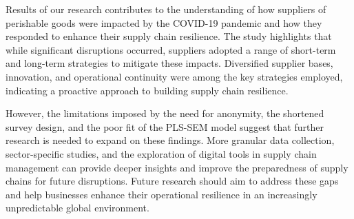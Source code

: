  Results of our research contributes to the understanding of how suppliers of perishable goods were impacted by the COVID-19 pandemic and how they responded to enhance their supply chain resilience. The study highlights that while significant disruptions occurred, suppliers adopted a range of short-term and long-term strategies to mitigate these impacts. Diversified supplier bases, innovation, and operational continuity were among the key strategies employed, indicating a proactive approach to building supply chain resilience.

However, the limitations imposed by the need for anonymity, the shortened survey design, and the poor fit of the PLS-SEM model suggest that further research is needed to expand on these findings. More granular data collection, sector-specific studies, and the exploration of digital tools in supply chain management can provide deeper insights and improve the preparedness of supply chains for future disruptions. Future research should aim to address these gaps and help businesses enhance their operational resilience in an increasingly unpredictable global environment.

 
